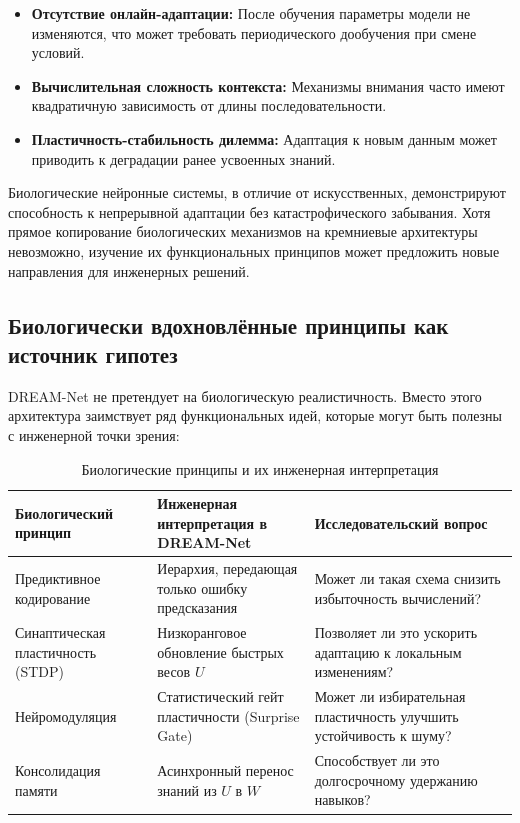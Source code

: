 \begin{itemize}
    \item \textbf{Отсутствие онлайн-адаптации:} После обучения параметры модели не изменяются, что может требовать периодического дообучения при смене условий.
    \item \textbf{Вычислительная сложность контекста:} Механизмы внимания часто имеют квадратичную зависимость от длины последовательности.
    \item \textbf{Пластичность-стабильность дилемма:} Адаптация к новым данным может приводить к деградации ранее усвоенных знаний.
\end{itemize}

Биологические нейронные системы, в отличие от искусственных, демонстрируют способность к непрерывной адаптации без катастрофического забывания. Хотя прямое копирование биологических механизмов на кремниевые архитектуры невозможно, изучение их функциональных принципов может предложить новые направления для инженерных решений.

\subsection{Биологически вдохновлённые принципы как источник гипотез}

DREAM-Net не претендует на биологическую реалистичность. Вместо этого архитектура заимствует ряд функциональных идей, которые могут быть полезны с инженерной точки зрения:

\begin{table}[h]
\centering
\caption{Биологические принципы и их инженерная интерпретация}
\label{tab:bio_principles}
\begin{tabular}{p{3.5cm}p{4.5cm}p{4cm}}
\toprule
\textbf{Биологический принцип} & \textbf{Инженерная интерпретация в DREAM-Net} & \textbf{Исследовательский вопрос} \\
\midrule
Предиктивное кодирование & Иерархия, передающая только ошибку предсказания & Может ли такая схема снизить избыточность вычислений? \\
Синаптическая пластичность (STDP) & Низкоранговое обновление быстрых весов $U$ & Позволяет ли это ускорить адаптацию к локальным изменениям? \\
Нейромодуляция & Статистический гейт пластичности (Surprise Gate) & Может ли избирательная пластичность улучшить устойчивость к шуму? \\
Консолидация памяти & Асинхронный перенос знаний из $U$ в $W$ & Способствует ли это долгосрочному удержанию навыков? \\
\bottomrule
\end{tabular}
\end{table}

